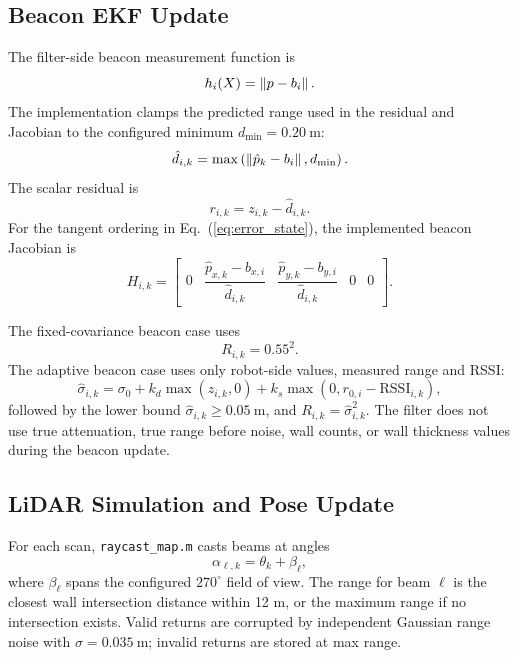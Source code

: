 \subsection{Beacon EKF Update}

The filter-side beacon measurement function is
\begin{equation}
    h_i(X)=\left\lVert p-b_i \right\rVert.
\end{equation}
The implementation clamps the predicted range used in the residual and Jacobian to the configured minimum \(d_{\min}=0.20~\mathrm{m}\):
\begin{equation}
    \hat{d}_{i,k}=\max\left(\left\lVert \hat{p}_k-b_i \right\rVert,d_{\min}\right).
\end{equation}
The scalar residual is
\begin{equation}
    r_{i,k}=z_{i,k}-\hat{d}_{i,k}.
\end{equation}
For the tangent ordering in Eq.~(\ref{eq:error_state}), the implemented beacon Jacobian is
\begin{equation}
H_{i,k}=
\begin{bmatrix}
0 &
\dfrac{\hat{p}_{x,k}-b_{x,i}}{\hat{d}_{i,k}} &
\dfrac{\hat{p}_{y,k}-b_{y,i}}{\hat{d}_{i,k}} &
0 & 0
\end{bmatrix}.
\label{eq:beacon_H}
\end{equation}

The fixed-covariance beacon case uses
\begin{equation}
    R_{i,k}=0.55^2.
\end{equation}
The adaptive beacon case uses only robot-side values, measured range and RSSI:
\begin{equation}
    \hat{\sigma}_{i,k}
    =
    \sigma_0
    + k_d\max(z_{i,k},0)
    + k_s\max(0,r_{0,i}-\mathrm{RSSI}_{i,k}),
\label{eq:adaptive_sigma}
\end{equation}
followed by the lower bound \(\hat{\sigma}_{i,k}\geq 0.05~\mathrm{m}\), and \(R_{i,k}=\hat{\sigma}_{i,k}^2\). The filter does not use true attenuation, true range before noise, wall counts, or wall thickness values during the beacon update.

\subsection{LiDAR Simulation and Pose Update}

For each scan, \texttt{raycast\_map.m} casts beams at angles
\begin{equation}
    \alpha_{\ell,k}=\theta_k+\beta_{\ell},
\end{equation}
where \(\beta_{\ell}\) spans the configured \(270^\circ\) field of view. The range for beam \(\ell\) is the closest wall intersection distance within 12 m, or the maximum range if no intersection exists. Valid returns are corrupted by independent Gaussian range noise with \(\sigma=0.035~\mathrm{m}\); invalid returns are stored at max range.

